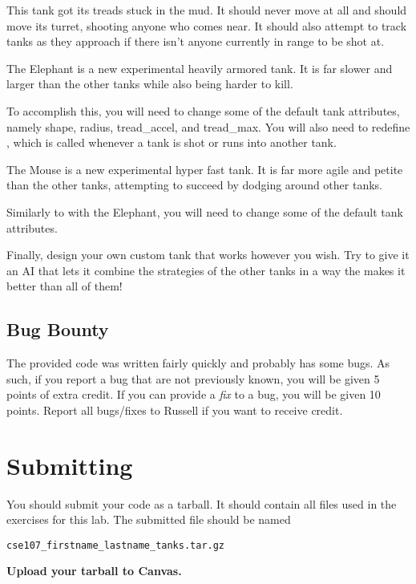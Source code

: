 \documentclass[11pt]{cselabheader}
\begin{document}
\begin{ex}[turret.py]
This tank got its treads stuck in the mud. It should never move at all and
should move its turret, shooting anyone who comes near. It should also attempt
to track tanks as they approach if there isn't anyone currently in range to be
shot at.
\end{ex}

\begin{ex}[elephant.py]
The Elephant is a new experimental heavily armored tank. It is far slower and
larger than the other tanks while also being harder to kill.

To accomplish this, you will need to change some of the default tank attributes,
namely shape, radius, tread\_accel, and tread\_max. You will also need to
redefine , which is called whenever a tank is shot
or runs into another tank.
\end{ex}

\begin{ex}[mouse.py]
The Mouse is a new experimental hyper fast tank. It is far more agile and
petite than the other tanks, attempting to succeed by dodging around other
tanks.

Similarly to with the Elephant, you will need to change some of the default tank
attributes.
\end{ex}

\begin{ex}[custom.py]
Finally, design your own custom tank that works however you wish. Try to give it
an AI that lets it combine the strategies of the other tanks in a way the makes
it better than all of them!
\end{ex}


\subsection{Bug Bounty}
The provided code was written fairly quickly and probably has some bugs.
As such, if you report a bug that
are not previously known, you will be given 5 points of extra credit. If you can
provide a \emph{fix} to a bug, you will be given 10 points. Report all
bugs/fixes to Russell if you want to receive credit.

\section{Submitting}
You should submit your code as a tarball. It should contain all files
used in the exercises for this lab. The submitted file should be named
\begin{center}
  \texttt{cse107\_firstname\_lastname\_tanks.tar.gz}
\end{center}

\begin{center}
  \textbf{Upload your tarball to Canvas.}
\end{center}

\listoftheorems
\end{document}
